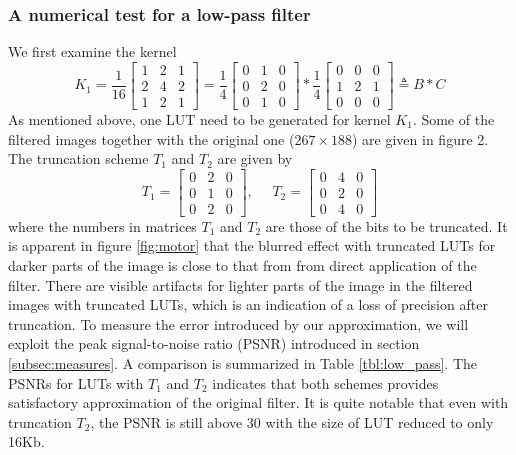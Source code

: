 \documentclass[12pt]{amsart}
\theoremstyle{definition}
\theoremstyle{remark}
\numberwithin{thm}{section}
\begin{document}
\subsubsection{A numerical test for a low-pass filter}
\label{subsubsection:numerical_test_lowpass}
We first examine the kernel
$$
K_1=\frac{1}{16}
\begin{bmatrix}
1 & 2 & 1\\
2 & 4 & 2\\
1 & 2 & 1
\end{bmatrix}
=
\frac{1}{4}
\begin{bmatrix}
0 & 1 & 0\\
0 & 2 & 0\\
0 & 1 & 0
\end{bmatrix}*\frac{1}{4}
\begin{bmatrix}
0 & 0 & 0\\
1 & 2 & 1\\
0 & 0 & 0
\end{bmatrix}\triangleq B*C
$$
As mentioned above, one LUT need to be generated for kernel $K_1$. Some of the filtered images together with the original one ($267\times 188$) are given in figure 2. The truncation scheme $T_1$ and $T_2$ are given by 
$$
T_1=
\begin{bmatrix}
0 & 2 & 0\\
0 & 1 & 0\\
0 & 2 & 0
\end{bmatrix}
,\ \ \ \ \ \ T_2=
\begin{bmatrix}
0 & 4 & 0\\
0 & 2 & 0\\
0 & 4 & 0
\end{bmatrix}
$$
where the numbers in matrices $T_1$ and $T_2$ are those of the bits to be truncated. It is apparent in figure \ref{fig:motor} that the blurred effect with truncated LUTs for darker parts of the image is close to that from from direct application of the filter. There are visible artifacts for lighter parts of the image in the filtered images with truncated LUTs, which is an indication of a loss of precision after truncation. To measure the error introduced by our approximation, we will exploit the peak signal-to-noise ratio (PSNR) introduced in section \ref{subsec:measures}. A comparison is summarized in Table \ref{tbl:low_pass}. The PSNRs for LUTs with $T_1$ and $T_2$ indicates that both schemes provides satisfactory approximation of the original filter. It is quite notable that even with truncation $T_2$, the PSNR is still above 30 with the size of LUT reduced to only 16Kb. 
\end{document}
